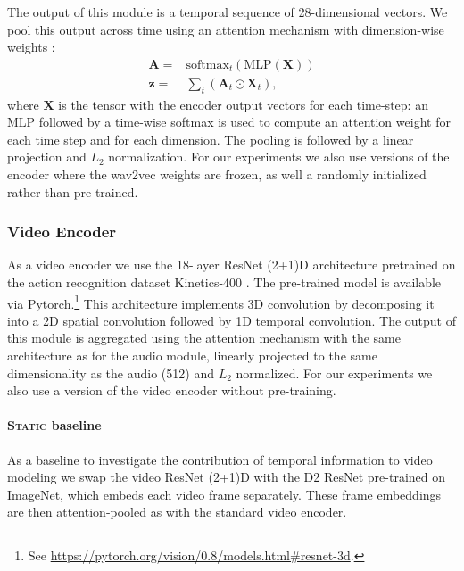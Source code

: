 The output of this module is a temporal sequence of 28-dimensional vectors. We
pool this output across time using an attention mechanism with
dimension-wise weights \citep{Merkx2019}:
\begin{equation}
  \begin{aligned}
    \mathbf{A} = & \mathrm{softmax}_t\left(\mathrm{MLP}(\mathbf{X})\right)\\
    \mathbf{z} = & \sum_t \left( \mathbf{A}_{t} \odot \mathbf{X}_{t} \right),
  \end{aligned}
  \label{eq:att-pool}
\end{equation}
where $\mathbf{X}$ is the tensor with the encoder output vectors for
each time-step: an MLP followed by a time-wise
softmax is used to compute an attention weight for each time step and for each
dimension.
The pooling is followed by a linear projection and $L_2$
normalization. For our experiments we also use versions of the encoder
where the wav2vec weights are frozen, as well a randomly initialized
rather than pre-trained.



\subsubsection{Video Encoder}
As a video encoder we use the 18-layer ResNet (2+1)D architecture
\citep{tran2018closer} pretrained on the action recognition dataset
Kinetics-400 \citep{DBLP:journals/corr/KayCSZHVVGBNSZ17}. The
pre-trained model is available via Pytorch.\footnote{See
  \url{https://pytorch.org/vision/0.8/models.html\#resnet-3d}.}  This
architecture implements 3D convolution by decomposing it into a 2D
spatial convolution followed by 1D temporal convolution.  The output
of this module is aggregated using the attention mechanism with the
same architecture as for the audio module, linearly projected to the
same dimensionality as the audio (512) and $L_2$ normalized.  For our
experiments we also use a version of the video encoder without
pre-training.

\paragraph{\textsc{Static} baseline}
As a baseline to investigate the contribution of temporal information to
video modeling we swap the video ResNet (2+1)D with the D2 ResNet
pre-trained on ImageNet, which embeds each video frame
separately. These frame embeddings are then attention-pooled as with
the standard video encoder. 


